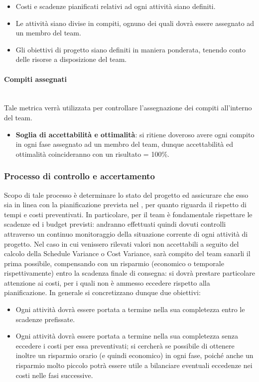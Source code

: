 \begin{itemize}
	\item Costi e scadenze pianificati relativi ad ogni attività siano definiti.
	\item Le attività siano divise in compiti, ognuno dei quali dovrà essere assegnato ad un membro del team.
	\item Gli obiettivi di progetto siano definiti in maniera ponderata, tenendo conto delle risorse a disposizione del team.
\end{itemize}

\paragraph{Compiti assegnati} 
~\\Tale metrica verrà utilizzata per controllare l'assegnazione dei compiti all'interno del team.

\begin{itemize}
	\item \textbf{Soglia di accettabilità e ottimalità}: si ritiene doveroso avere ogni compito in ogni fase assegnato ad un membro del team, dunque accettabilità ed ottimalità coincideranno con un risultato = 100\%.
\end{itemize}

\subsubsection{Processo di controllo e accertamento}
Scopo di tale processo è determinare lo stato del progetto ed assicurare che esso sia in linea con la pianificazione prevista nel \PdP, per quanto riguarda il rispetto di tempi e costi preventivati.
In particolare, per il team è fondamentale rispettare le scadenze ed i budget previsti: andranno effettuati quindi dovuti controlli attraverso un continuo monitoraggio della situazione corrente di ogni attività di progetto. Nel caso in cui venissero rilevati valori non accettabili a seguito del calcolo della Schedule Variance o Cost Variance, sarà compito del team sanarli il prima possibile, compensando con un risparmio (economico o temporale rispettivamente) entro la scadenza finale di consegna: si dovrà prestare particolare attenzione ai costi, per i quali non è ammesso eccedere rispetto alla pianificazione. 
In generale si concretizzano dunque due obiettivi:

\begin{itemize}
	\item Ogni attività dovrà essere portata a termine nella sua completezza entro le scadenze prefissate.
	\item Ogni attività dovrà essere portata a termine nella sua completezza senza eccedere i costi per essa preventivati; si cercherà se possibile di ottenere inoltre un risparmio orario (e quindi economico) in ogni fase, poiché anche un risparmio molto piccolo potrà essere utile a bilanciare eventuali eccedenze nei costi nelle fasi successive.
\end{itemize} 


